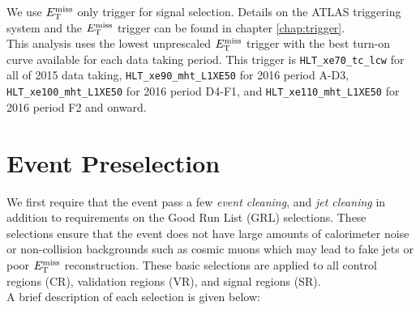 \indent We use $E_{\mathrm{T}}^{\mathrm{miss}}$ only trigger for signal selection. Details on the ATLAS triggering system and the $E_{\mathrm{T}}^{\mathrm{miss}}$ trigger can be found in chapter \ref{chap:trigger}.  \\

\indent This analysis uses the lowest unprescaled $E_{\mathrm{T}}^{\mathrm{miss}}$ trigger with the best turn-on curve available for each data taking period.  This trigger is {\tt HLT\_xe70\_tc\_lcw} for all of 2015 data taking, \verb+HLT_xe90_mht_L1XE50+ for 2016 period A-D3, \verb+HLT_xe100_mht_L1XE50+ for 2016 period D4-F1, and \verb+HLT_xe110_mht_L1XE50+ for 2016 period F2 and onward.\\



\chapter{Event Preselection}
\label{sec:Selection_EventPreselection}

\indent We first require that the event pass a few {\it event cleaning}, and {\it jet cleaning} in addition to requirements on the Good Run List (GRL) selections. These selections ensure that the event does not have large amounts of calorimeter noise or non-collision backgrounds such as cosmic muons which may lead to fake jets or poor $E_{\mathrm{T}}^{\mathrm{miss}}$ reconstruction. These basic selections are applied to all control regions (CR), validation regions (VR), and signal regions (SR).  \\

\indent A brief description of each selection is given below: \\

